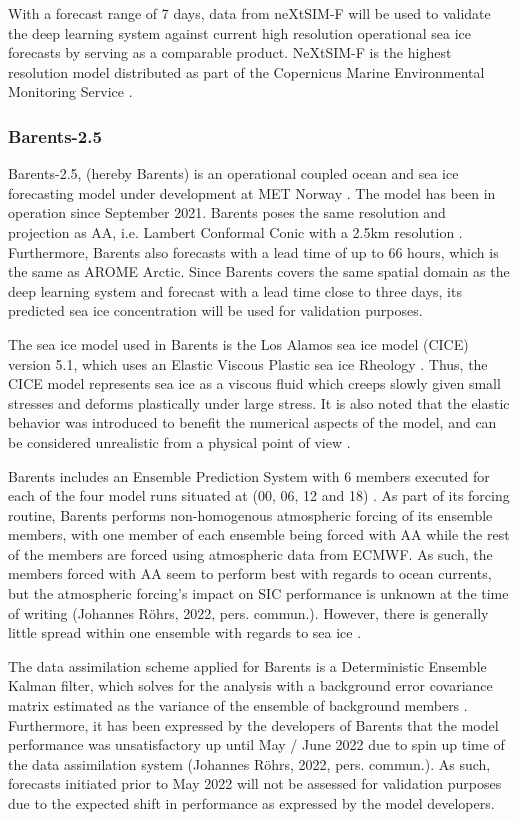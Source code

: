 \documentclass[../main/thesis.tex]{subfiles}
\begin{document}
With a forecast range of 7 days, data from neXtSIM-F will be used to validate the deep learning system against current high resolution operational sea ice forecasts by serving as a comparable product. NeXtSIM-F is the highest resolution model distributed as part of the Copernicus Marine Environmental Monitoring Service \citep{nextsimdata2020}.

\subsubsection{Barents-2.5}
\label{sec:barents}
Barents-2.5, (hereby Barents) is an operational coupled ocean and sea ice forecasting model under development at MET Norway \citep{Roehrs2022}. The model has been in operation since September 2021. Barents poses the same resolution and projection as AA, i.e. Lambert Conformal Conic with a 2.5km resolution \citep{Roehrs2022,Mueller2017}. Furthermore, Barents also forecasts with a lead time of up to 66 hours, which is the same as AROME Arctic. Since Barents covers the same spatial domain as the deep learning system and forecast with a lead time close to three days, its predicted sea ice concentration will be used for validation purposes.

The sea ice model used in Barents is the Los Alamos sea ice model (CICE) version 5.1, which uses an Elastic Viscous Plastic sea ice Rheology \citep{Hunke2015}. Thus, the CICE model represents sea ice as a viscous fluid which creeps slowly given small stresses and deforms plastically under large stress. It is also noted that the elastic behavior was introduced to benefit the numerical aspects of the model, and can be considered unrealistic from a physical point of view \citep{Hunke1997}.

Barents includes an Ensemble Prediction System with 6 members executed for each of the four model runs situated at (00, 06, 12 and 18) \citep{Roehrs2022}. As part of its forcing routine, Barents performs non-homogenous atmospheric forcing of its ensemble members, with one member of each ensemble being forced with AA while the rest of the members are forced using atmospheric data from ECMWF. As such, the members forced with AA seem to perform best with regards to ocean currents, but the atmospheric forcing's impact on SIC performance is unknown at the time of writing (Johannes Röhrs, 2022, pers. commun.). However, there is generally little spread within one ensemble with regards to sea ice \citep{Roehrs2022}.

The data assimilation scheme applied for Barents is a Deterministic Ensemble Kalman filter, which solves for the analysis with a background error covariance matrix estimated as the variance of the ensemble of background members \citep{Roehrs2022}. Furthermore, it has been expressed by the developers of Barents that the model performance was unsatisfactory up until May / June 2022 due to spin up time of the data assimilation system (Johannes Röhrs, 2022, pers. commun.). As such, forecasts initiated prior to May 2022 will not be assessed for validation purposes due to the expected shift in performance as expressed by the model developers.
\end{document}

